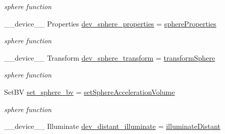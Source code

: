 \begin{DoxyCompactItemize}
\begin{DoxyCompactList}\small\item\em sphere function \end{DoxyCompactList}\item 
\+\_\+\+\_\+device\+\_\+\+\_\+ Properties \hyperlink{group__device__pointers_ga4d14ea4399efac27739f61e12a806591}{dev\+\_\+sphere\+\_\+properties} = \hyperlink{group__intersection__test__prperties_gae821d5671069271f7c39d22ca8950f3d}{sphere\+Properties}\hypertarget{group__device__pointers_ga4d14ea4399efac27739f61e12a806591}{}\label{group__device__pointers_ga4d14ea4399efac27739f61e12a806591}

\begin{DoxyCompactList}\small\item\em sphere function \end{DoxyCompactList}\item 
\+\_\+\+\_\+device\+\_\+\+\_\+ Transform \hyperlink{group__device__pointers_gaede5be8cca4942f24473afcbdaa177e4}{dev\+\_\+sphere\+\_\+transform} = \hyperlink{group__intersection__test__prperties_ga6fe7123c4c4bdf775eac1231bc37c490}{transform\+Sphere}\hypertarget{group__device__pointers_gaede5be8cca4942f24473afcbdaa177e4}{}\label{group__device__pointers_gaede5be8cca4942f24473afcbdaa177e4}

\begin{DoxyCompactList}\small\item\em sphere function \end{DoxyCompactList}\item 
Set\+BV \hyperlink{group__device__pointers_gac53e785e30a603faf7fd77856e39cd0f}{set\+\_\+sphere\+\_\+bv} = \hyperlink{group__intersection__test__prperties_gafd2f15ce4a55fb0d8daee0bff024b67b}{set\+Sphere\+Acceleration\+Volume}\hypertarget{group__device__pointers_gac53e785e30a603faf7fd77856e39cd0f}{}\label{group__device__pointers_gac53e785e30a603faf7fd77856e39cd0f}

\begin{DoxyCompactList}\small\item\em sphere function \end{DoxyCompactList}\item 
\+\_\+\+\_\+device\+\_\+\+\_\+ Illuminate \hyperlink{group__device__pointers_ga29d3a70fa1f9d926548b068b7cda5d44}{dev\+\_\+distant\+\_\+illuminate} = \hyperlink{group__intersection__test__prperties_ga6a438778f6ed8683785d7a892a05d312}{illuminate\+Distant}\hypertarget{group__device__pointers_ga29d3a70fa1f9d926548b068b7cda5d44}{}\label{group__device__pointers_ga29d3a70fa1f9d926548b068b7cda5d44}


\end{DoxyCompactItemize}
